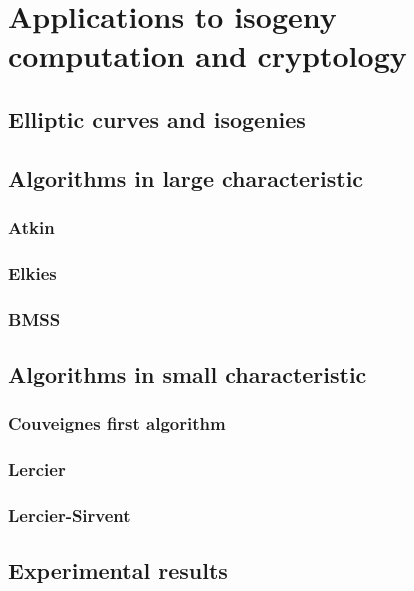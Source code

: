 \part{Applications to isogeny computation and cryptology}

\chapter{Elliptic curves and isogenies}



\chapter{Algorithms in large characteristic}
\section{Atkin}
\section{Elkies}
\section{BMSS}

\chapter{Algorithms in small characteristic}
\label{cha:algor-small-char}
\section{Couveignes first algorithm}
\section{Lercier}
\section{Lercier-Sirvent}






\chapter{Experimental results}




%

